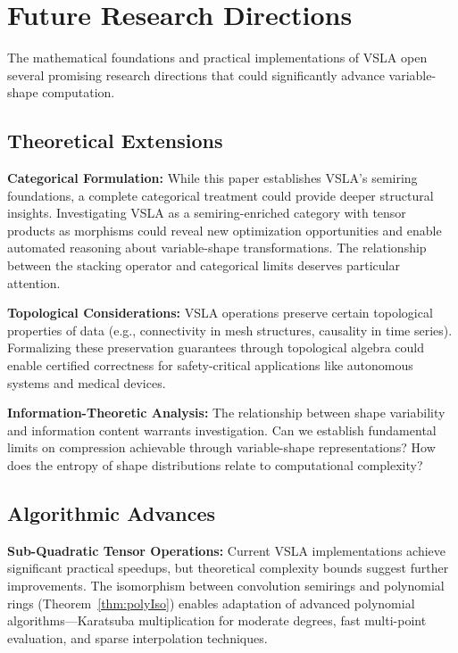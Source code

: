 \section{Future Research Directions}
\label{sec:future}

The mathematical foundations and practical implementations of VSLA open several promising research directions that could significantly advance variable-shape computation.

\subsection{Theoretical Extensions}

\textbf{Categorical Formulation:} While this paper establishes VSLA's semiring foundations, a complete categorical treatment could provide deeper structural insights. Investigating VSLA as a semiring-enriched category with tensor products as morphisms could reveal new optimization opportunities and enable automated reasoning about variable-shape transformations. The relationship between the stacking operator and categorical limits deserves particular attention.

\textbf{Topological Considerations:} VSLA operations preserve certain topological properties of data (e.g., connectivity in mesh structures, causality in time series). Formalizing these preservation guarantees through topological algebra could enable certified correctness for safety-critical applications like autonomous systems and medical devices.

\textbf{Information-Theoretic Analysis:} The relationship between shape variability and information content warrants investigation. Can we establish fundamental limits on compression achievable through variable-shape representations? How does the entropy of shape distributions relate to computational complexity?

\subsection{Algorithmic Advances}

\textbf{Sub-Quadratic Tensor Operations:} Current VSLA implementations achieve significant practical speedups, but theoretical complexity bounds suggest further improvements. The isomorphism between convolution semirings and polynomial rings (Theorem~\ref{thm:polyIso}) enables adaptation of advanced polynomial algorithms—Karatsuba multiplication for moderate degrees, fast multi-point evaluation, and sparse interpolation techniques.

